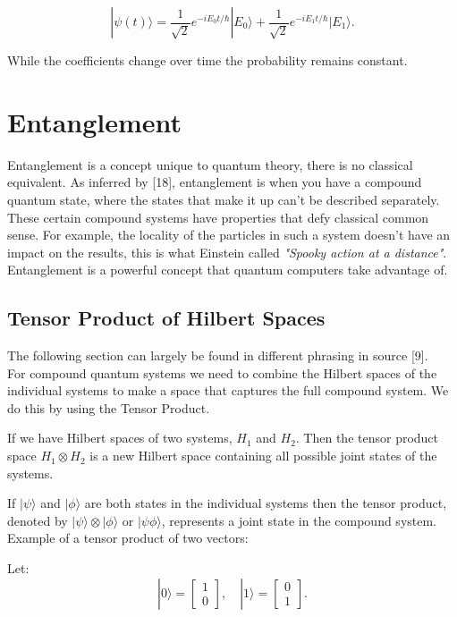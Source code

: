 \[
|\psi(t)\rangle = \frac{1}{\sqrt{2}} e^{-iE_0 t/\hbar} |E_0\rangle + \frac{1}{\sqrt{2}} e^{-iE_1 t/\hbar} |E_1\rangle.
\]

\noindent While the coefficients change over time the probability remains constant.


\section{Entanglement}
Entanglement is a concept unique to quantum theory, there is no classical equivalent. As inferred by [18], entanglement is when you have a compound quantum state, where the states that make it up can't be described separately. These certain compound systems have properties that defy classical common sense. For example, the locality of the particles in such a system doesn't have an impact on the results, this is what Einstein called \textit{"Spooky action at a distance"}. Entanglement is a powerful concept that quantum computers take advantage of.


\subsection{Tensor Product of Hilbert Spaces}
The following section can largely be found in different phrasing in source [9].\\
\noindent For compound quantum systems we need to combine the Hilbert spaces of the individual systems to make a space that captures the full compound system. We do this by using the Tensor Product.

\noindent If we have Hilbert spaces of two systems, $H_1$ and $H_2$. Then the tensor product space \( H_1 \otimes H_2\) is a new Hilbert space containing all possible joint states of the systems.

\noindent If $|\psi\rangle$ and $|\phi\rangle$ are both states in the individual systems then the tensor product, denoted by \( |\psi\rangle \otimes |\phi\rangle \text{ or } |\psi\phi\rangle\), represents a joint state in the compound system. Example of a tensor product of two vectors:


\noindent Let:
\[
|0\rangle = \begin{bmatrix} 1 \\ 0 \end{bmatrix}, \quad
|1\rangle = \begin{bmatrix} 0 \\ 1 \end{bmatrix}.
\]

